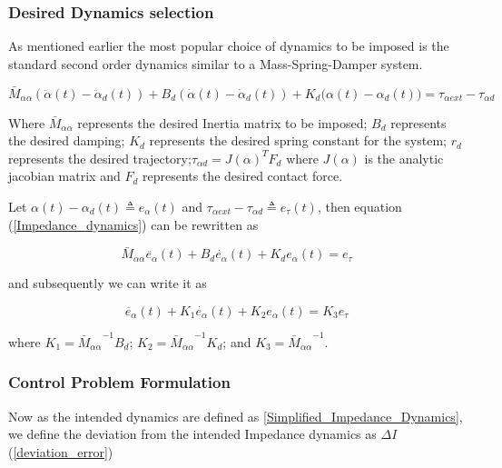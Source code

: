 \documentclass[letterpaper, 10 pt, conference]{ieeeconf}  %
\begin{document}
\subsubsection{Desired Dynamics selection}

As mentioned earlier the most popular choice of dynamics to be imposed is the standard second order dynamics similar to a Mass-Spring-Damper system.

\begin{equation} \label{Impedance_dynamics}
\bar{M}_{\alpha\alpha}( \ddot{\alpha}(t) - \ddot{\alpha}_d(t)  ) + B_d ( \dot{\alpha}(t) - \dot{\alpha}_d(t)) + K_d ( {\alpha}(t) - {\alpha_d(t))} = {\tau}_{{\alpha}ext} - {\tau}_{{\alpha}d}  
\end{equation}

Where $\bar{M}_{\alpha\alpha}$ represents the desired Inertia matrix to be imposed; $B_d$ represents the desired damping; $K_d$ represents the desired spring constant for the system; ${r}_d$ represents the desired trajectory;${\tau}_{{\alpha}d} = J(\alpha)^{T} F_d$ where $J(\alpha)$ is the analytic jacobian matrix and ${F}_d$ represents the desired contact force.

Let ${\alpha}(t) - {\alpha}_d(t) \triangleq  {e_\alpha}(t)$ and ${\tau}_{{\alpha}ext} - {\tau}_{{\alpha}d}  \triangleq  {e_{\tau}}(t)$, then equation (\ref{Impedance_dynamics}) can be rewritten as 

\begin{equation}
    \bar{M}_{\alpha\alpha} \ddot{e_\alpha}(t) + B_d \dot{e_\alpha}(t) + K_d {e_\alpha}(t) = e_{\tau}
\end{equation}

and subsequently we can write it as

\begin{equation} \label{Simplified_Impedance_Dynamics}
 \ddot{e_\alpha}(t)  + {K_1}  \dot{e_\alpha}(t) +  {K_2} {e_\alpha}(t) = {K_3} e_{\tau}   
\end{equation}

where $K_1 = {\bar{M}_{\alpha\alpha}}^{-1} B_d$; $K_2 = {\bar{M}_{\alpha\alpha}}^{-1} K_d$; and $K_3 = {\bar{M}_{\alpha\alpha}}^{-1}$. 

\subsubsection{Control Problem Formulation}
Now as the intended dynamics are defined as \ref{Simplified_Impedance_Dynamics}, we define the deviation from the intended Impedance dynamics as $\Delta I$ (\ref{deviation_error})
\end{document}
